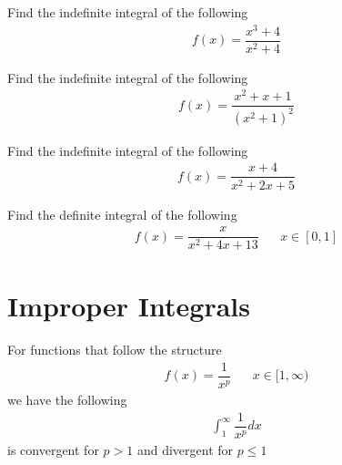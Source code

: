 \begin{exercise}
Find the indefinite integral of the following
\begin{align*}
    f(x) = \dfrac{x^{3} + 4}{x^{2} + 4}
\end{align*}
\end{exercise}

\begin{exercise}
Find the indefinite integral of the following
\begin{align*}
    f(x) = \dfrac{x^{2} + x + 1}{(x^{2} + 1)^{2}}
\end{align*}
\end{exercise}

\begin{exercise}
Find the indefinite integral of the following
\begin{align*}
    f(x) = \dfrac{x + 4}{x^{2} + 2x + 5}
\end{align*}
\end{exercise}

\begin{exercise}
Find the definite integral of the following
\begin{align*}
    f(x) = \dfrac{x}{x^{2} + 4x + 13} \hspace{20pt} x \in [0, 1]
\end{align*}
\end{exercise}

\newpage
\section{Improper Integrals}

\begin{theorem}
For functions that follow the structure
\begin{align*}
    f(x) = \dfrac{1}{x^{p}} \hspace{20pt} x \in [1, \infty)
\end{align*}
we have the following
\begin{align*}
    \int_{1}^{\infty} \dfrac{1}{x^{p}} dx
\end{align*}
is convergent for $p > 1$ and divergent for $p \leq 1$
\end{theorem}